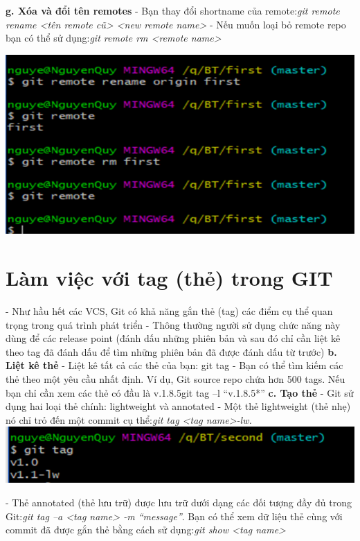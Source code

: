 \documentclass[12pt,a4paper]{report}
\begin{document}
	\label{fig:screenshot040}\vskip 0.4cm\vskip 0.4cm

{\bf g. Xóa và đổi tên remotes} \vskip 0.4cm
- Bạn thay đổi shortname của remote:{\it git remote rename <tên remote cũ> <new remote name>}\vskip 0.4cm
- Nếu muốn loại bỏ remote repo  bạn có thể sử dụng:{\it git remote rm <remote name> }
\vskip 0.4cm

	\includegraphics[width=0.8\linewidth]{screenshot041}

	\label{fig:screenshot041}
\newpage

			
\section{Làm việc với tag (thẻ) trong GIT}
\hspace{0.6cm}{\bf a. Gắn thẻ} \vskip 0.4cm
- Như hầu hết các VCS, Git có khả năng gắn thẻ (tag) các điểm cụ thể quan trọng trong quá trình phát triển\vskip 0.4cm
- Thông thường người sử dụng chức năng này dùng để các release point (đánh dấu những phiên bản và sau đó chỉ cần liệt kê theo tag đã đánh dấu để tìm những phiên bản đã được đánh dấu từ trước)\vskip 0.4cm
{\bf b. Liệt kê thẻ} \vskip 0.4cm
- Liệt kê tất cả các thẻ của bạn: git tag\vskip 0.4cm
- Bạn có thể tìm kiếm các thẻ theo một yêu cầu nhất định. Ví dụ, Git source repo chứa hơn 500 tags. Nếu bạn chỉ cần xem các thẻ có đầu là v.1.8.5git tag –l “v.1.8.5*”\vskip 0.4cm
{\bf c. Tạo thẻ} \vskip 0.4cm
- Git sử dụng hai loại thẻ chính: lightweight và annotated\vskip 0.4cm
- Một thẻ lightweight (thẻ nhẹ) nó chỉ trỏ đến một commit cụ thể:{\it git tag <tag name>-lw.} \vskip 0.4cm
	\includegraphics[width=0.8\linewidth]{screenshot042}

	\label{fig:screenshot042}
\vskip 0.4cm\vskip 0.4cm
- Thẻ annotated (thẻ lưu trữ) được lưu trữ dưới dạng các đối tượng đầy đủ trong Git:{\it git tag –a <tag name> -m “message”}. Bạn có thể xem dữ liệu thẻ cùng với commit đã được gắn thẻ bằng cách sử dụng:{\it git show <tag name>}\vskip 0.4cm
\end{document}
